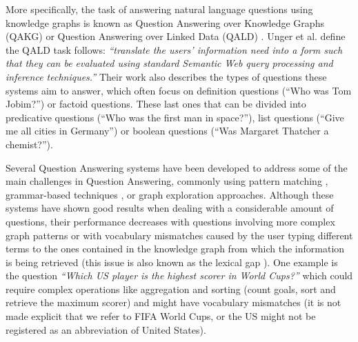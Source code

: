 More specifically, the task of answering natural language questions using knowledge graphs 
is known as Question Answering over Knowledge Graphs (QAKG) \cite{qa:nn-qakg-Chakraborty19} or Question 
Answering over Linked Data (QALD) \cite{qa:intro-UngerFC14, qa:qald-Lopezetal2013}. Unger et al. \cite{qa:intro-UngerFC14} define the QALD task
follows: \textit{“translate the users’ information need into a form such that they can be evaluated using 
standard Semantic Web query processing and inference techniques.”} Their work also describes 
the types of questions these systems aim to answer, which often focus on definition questions 
(“Who was Tom Jobim?”) or factoid questions. These last ones that can be divided into 
predicative questions (“Who was the first man in space?”), list questions (“Give me all cities 
in Germany”) or boolean questions (“Was Margaret Thatcher a chemist?”). 

Several Question Answering systems have been developed to address some of the main 
challenges in Question Answering, commonly using pattern matching \cite{qa:pattern-FaderZE13, qa:pattern-LopezFMS12}, 
grammar-based techniques \cite{qa:grammar-DamljanovicAC10, qa:grammar-2-Marginean17}, 
or graph exploration \cite{qa:graph-XuFZ14, qa:graph-2-ZouHWYHZ14} approaches. Although these systems have 
shown good results when dealing with a considerable amount of questions, their performance 
decreases \cite{qa:challenges-semweb-HoffnerWMULN17} with questions involving more complex graph patterns or with vocabulary 
mismatches caused by the user typing different terms to the ones contained in the knowledge 
graph from which the information is being retrieved (this issue is also known as the lexical gap \cite{semPar:lexical-gap-HakimovUWC15}). One example 
is the question \textit{“Which US player is the highest scorer in World Cups?”} which could require 
complex operations like aggregation and sorting (count goals, sort and retrieve the maximum 
scorer) and might have vocabulary mismatches (it is not made explicit that we refer to FIFA World 
Cups, or the US might not be registered as an abbreviation of United States).

